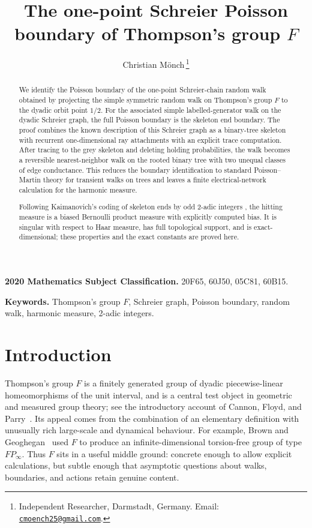 \documentclass[11pt,a4paper]{scrartcl}
\title{The one-point Schreier Poisson boundary of Thompson's group \(F\)}
\author{Christian M\"onch\,\orcidlink{0000-0002-6531-6482}\thanks{Independent
Researcher, Darmstadt, Germany. Email:
\href{mailto:cmoench25@gmail.com}{\nolinkurl{cmoench25@gmail.com}}.}}
\date{}
\begin{document}
\maketitle

\begin{abstract}
We identify the Poisson boundary of the one-point Schreier-chain random walk
obtained by projecting the simple symmetric random walk on Thompson's group
\(F\) to the dyadic orbit point \(1/2\).  For the associated simple
labelled-generator walk on the dyadic Schreier graph, the full Poisson boundary
is the skeleton end boundary.  The proof combines the known description of
this Schreier graph as a binary-tree skeleton with recurrent one-dimensional
ray attachments with an explicit trace computation.  After tracing to the
grey skeleton and deleting holding probabilities, the walk becomes a reversible
nearest-neighbor walk on the rooted binary tree with two unequal classes of
edge conductance.  This reduces the boundary identification to standard
Poisson--Martin theory for transient walks on trees and leaves a finite
electrical-network calculation for the harmonic measure.

Following Kaimanovich's coding of skeleton ends by odd 2-adic integers
\cite[{\emph{Groups, Graphs and Random Walks}}, London Math. Soc. Lecture Note
Ser.~436, pp.~300--342, 2017]{Kaimanovich2017}, the hitting measure is a
biased Bernoulli product measure with explicitly computed bias.  It is singular
with respect to Haar measure, has full topological support, and is
exact-dimensional; these properties and the exact constants are proved here.

\end{abstract}

\noindent\textbf{2020 Mathematics Subject Classification.}
20F65, 60J50, 05C81, 60B15.

\smallskip
\noindent\textbf{Keywords.}
Thompson's group \(F\), Schreier graph, Poisson boundary, random walk,
harmonic measure, 2-adic integers.

\section{Introduction}\label{sec:introduction}


Thompson's group \(F\) is a finitely generated group of dyadic
piecewise-linear homeomorphisms of the unit interval, and is a central test
object in geometric and measured group theory; see the introductory account of
Cannon, Floyd, and Parry~\cite{CannonFloydParry1996}. Its appeal comes from the
combination of an elementary definition with unusually rich large-scale and
dynamical behaviour. For example, Brown and Geoghegan~\cite{BrownGeoghegan1984}
used \(F\) to produce an infinite-dimensional torsion-free group of type
\(FP_\infty\). Thus \(F\) sits in a useful middle ground: concrete enough to
allow explicit calculations, but subtle enough that asymptotic questions about
walks, boundaries, and actions retain genuine content.
\end{document}
